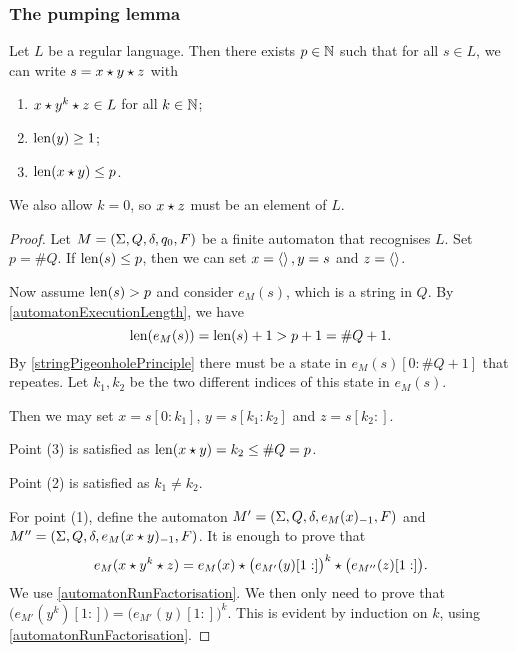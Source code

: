 \subsubsection{The pumping lemma}
\begin{theorem}
Let $L$ be a regular language. Then there exists $p\in \mathbb{N}$ such that for all $s \in L$, we can write $s = x\star y \star z$ with
\begin{enumerate}
\item $x\star y^k \star z \in L$ for all $k\in\mathbb{N}$;
\item $\operatorname{len}(y) \geq 1$;
\item $\operatorname{len}(x\star y) \leq p$.
\end{enumerate}
\end{theorem}
We also allow $k=0$, so $x\star z$ must be an element of $L$.
\begin{proof}
Let $M = \left( \Sigma, Q, \delta, q_0, F \right)$ be a finite automaton that recognises $L$. Set $p = \#Q$. If $\operatorname{len}(s) \leq p$, then we can set $x=\left\langle  \right\rangle, y= s$ and $z=\left\langle  \right\rangle$.

Now assume $\operatorname{len}(s) > p$ and consider $e_M(s)$, which is a string in $Q$. By \ref{automatonExecutionLength}, we have
\[ \operatorname{len}(e_M(s)) = \operatorname{len}(s)+1 > p +1 = \#Q+1. \]
By \ref{stringPigeonholePrinciple} there must be a state in $e_M(s)[0:\#Q+1]$ that repeates. Let $k_1, k_2$ be the two different indices of this state in $e_M(s)$.

Then we may set $x = s[0:k_1]$, $y = s[k_1:k_2]$ and $z = s[k_2:]$.

Point (3) is satisfied as $\operatorname{len}(x\star y) = k_2 \leq \#Q = p$.

Point (2) is satisfied as $k_1\neq k_2$.

For point (1), define the automaton $M' = \left( \Sigma, Q, \delta, e_M(x)_{-1}, F \right)$ and $M^{\prime\prime} = \left( \Sigma, Q, \delta, e_M(x\star y)_{-1}, F \right)$.
It is enough to prove that
\[ e_M(x\star y^k \star z) = e_M(x)\star \big(e_{M'}(y)[1:]\big)^k \star \big(e_{M^{\prime\prime}}(z)[1:]\big). \]
We use \ref{automatonRunFactorisation}. We then only need to prove that $\big(e_{M'}(y^k)[1:]\big) = \big(e_{M'}(y)[1:]\big)^k$. This is evident by induction on $k$, using \ref{automatonRunFactorisation}.
\end{proof}

